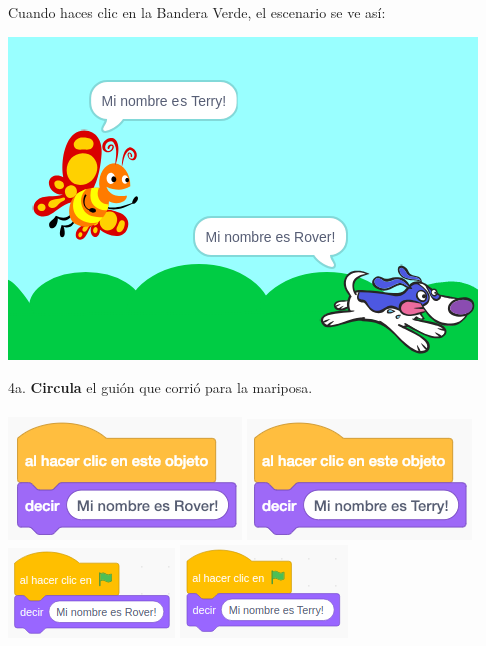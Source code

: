\documentclass[letterpaper,12pt]{article}
\begin{document}
\newpage
\noindent  Cuando haces clic en la Bandera Verde, el escenario se ve así:
\begin{center}
\includegraphics[scale=.5]{q4_stage.png}
\end{center}

\noindent 4a. \textbf{Circula} el guión que corrió para la mariposa. \\ \\
\includegraphics[scale=.5,valign=t]{q4_script0.png} \hspace{.5cm}
\includegraphics[scale=.5,valign=t]{q4_script1.png} \hspace{.5cm}
\includegraphics[scale=.7,valign=t]{q4_script2.png} \hspace{.5cm}
\includegraphics[scale=.7,valign=t]{q4_script3.png} \hspace{.5cm}
\vspace{1cm}
\end{document}
